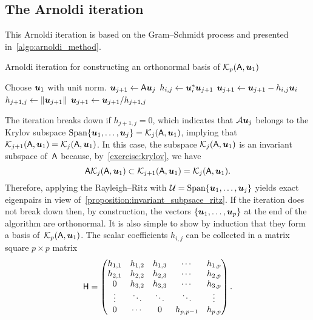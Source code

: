 \subsection{The Arnoldi iteration}
This Arnoldi iteration is based on the Gram--Schmidt process and presented in~\cref{algo:arnoldi_method}.
\begin{algorithm}
\caption{Arnoldi iteration for constructing an orthonormal basis of $\mathcal K_p(\mathsf A, \mathbf{\boldsymbol{u}}_1)$}%
\label{algo:arnoldi_method}%
\begin{algorithmic}
\State Choose $\mathbf{\boldsymbol{u}}_1$ with unit norm.
    \State $\mathbf{\boldsymbol{u}}_{j+1} \gets \mathsf A \mathbf{\boldsymbol{u}}_{j}$
        \State $h_{i,j} \gets \mathbf{\boldsymbol{u}}_{i}^* \mathbf{\boldsymbol{u}}_{j+1}$
        \State $\mathbf{\boldsymbol{u}}_{j+1} \gets \mathbf{\boldsymbol{u}}_{j+1} - h_{i,j} \mathbf{\boldsymbol{u}}_{i}$
    \EndFor
    \State $h_{j+1,j} \gets \lVert\mathbf{\boldsymbol{u}}_{j+1}\rVert$
    \State $\mathbf{\boldsymbol{u}}_{j+1} \gets \mathbf{\boldsymbol{u}}_{j+1} / h_{j+1,j}$
\EndFor
\end{algorithmic}
\end{algorithm}
The iteration breaks down if $h_{j+1,j} = 0$,
which indicates that $\mathcal A \mathbf{\boldsymbol{u}}_j$ belongs to the Krylov subspace $\operatorname{Span} \{ \mathbf{\boldsymbol{u}}_1, \dotsc, \mathbf{\boldsymbol{u}}_j \} = \mathcal K_j(\mathsf A, \mathbf{\boldsymbol{u}}_1)$,
implying that $\mathcal K_{j+1}(\mathsf A, \mathbf{\boldsymbol{u}}_1) = \mathcal K_j(\mathsf A, \mathbf{\boldsymbol{u}}_1)$.
In this case, the subspace $\mathcal K_j(\mathsf A, \mathbf{\boldsymbol{u}}_1)$ is an invariant subspace of~$\mathsf A$ because, by~\cref{exercise:krylov},
we have
\[
    \mathsf A \mathcal K_j(\mathsf A, \mathbf{\boldsymbol{u}}_1)
    \subset \mathcal K_{j+1}(\mathsf A, \mathbf{\boldsymbol{u}}_1)
    = \mathcal K_j(\mathsf A, \mathbf{\boldsymbol{u}}_1).
\]
Therefore, applying the Rayleigh--Ritz with $\mathcal U = \operatorname{Span} \{ \mathbf{\boldsymbol{u}}_1, \dotsc, \mathbf{\boldsymbol{u}}_j \}$ yields exact eigenpairs in view of~\cref{proposition:invariant_subpsace_ritz}.
If the iteration does not break down then,
by construction,
the vectors $\{\mathbf{\boldsymbol{u}}_1, \dotsc, \mathbf{\boldsymbol{u}}_p\}$ at the end of the algorithm are orthonormal.
It is also simple to show by induction that they form a basis of~$\mathcal K_p(\mathsf A, \mathbf{\boldsymbol{u}}_1)$.
The scalar coefficients $h_{i,j}$ can be collected in a matrix square $p \times p$ matrix
\[
    \mathsf H
    =
    \begin{pmatrix}
        h_{1,1} & h_{1,2} & h_{1,3} & \cdots  & h_{1,p} \\
        h_{2,1} & h_{2,2} & h_{2,3} & \cdots  & h_{2,p} \\
        0       & h_{3,2} & h_{3,3} & \cdots  & h_{3,p} \\
        \vdots  & \ddots  & \ddots  & \ddots  & \vdots  \\
        0       & \cdots  & 0     & h_{p,p-1} & h_{p,p}
    \end{pmatrix}.
\]
